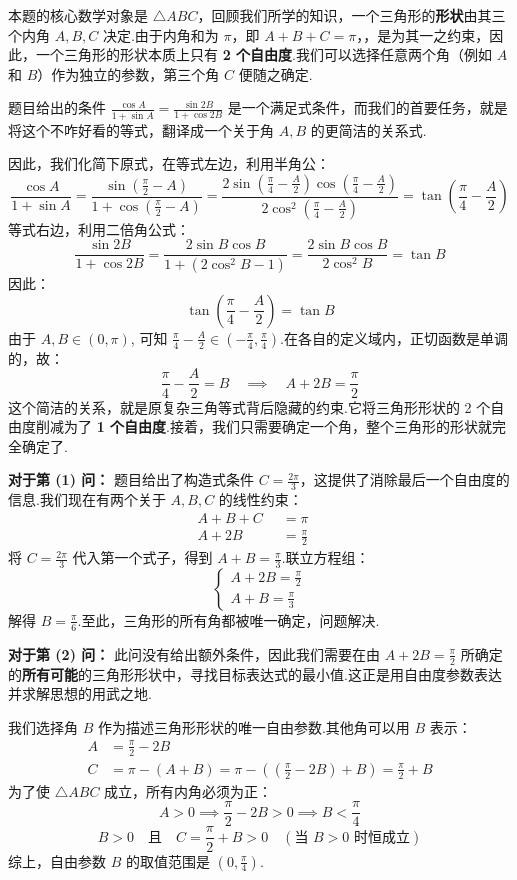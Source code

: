 \begin{solution}
	本题的核心数学对象是 $\triangle ABC$，回顾我们所学的知识，一个三角形的\textbf{形状}由其三个内角 $A, B, C$ 决定.由于内角和为 $\pi$，即 $A+B+C=\pi$，，是为其一之约束，因此，一个三角形的形状本质上只有 \textbf{2 个自由度}.我们可以选择任意两个角（例如 $A$ 和 $B$）作为独立的参数，第三个角 $C$ 便随之确定.
	
	题目给出的条件 $\frac{\cos A}{1+\sin A} = \frac{\sin 2B}{1+\cos 2B}$ 是一个满足式条件，而我们的首要任务，就是将这个不咋好看的等式，翻译成一个关于角 $A, B$ 的更简洁的关系式.
	
	因此，我们化简下原式，在等式左边，利用半角公：
	\[
	\frac{\cos A}{1+\sin A} = \frac{\sin(\frac{\pi}{2}-A)}{1+\cos(\frac{\pi}{2}-A)} = \frac{2\sin(\frac{\pi}{4}-\frac{A}{2})\cos(\frac{\pi}{4}-\frac{A}{2})}{2\cos^2(\frac{\pi}{4}-\frac{A}{2})} = \tan\left(\frac{\pi}{4}-\frac{A}{2}\right)
	\]
	等式右边，利用二倍角公式：
	\[
	\frac{\sin 2B}{1+\cos 2B} = \frac{2\sin B \cos B}{1+(2\cos^2 B-1)} = \frac{2\sin B \cos B}{2\cos^2 B} = \tan B
	\]
	因此：
	\[
	\tan\left(\frac{\pi}{4}-\frac{A}{2}\right) = \tan B
	\]
	由于 $A, B \in (0, \pi)$, 可知 $\frac{\pi}{4}-\frac{A}{2} \in (-\frac{\pi}{4}, \frac{\pi}{4})$.在各自的定义域内，正切函数是单调的，故：
	\[
	\frac{\pi}{4}-\frac{A}{2} = B \quad \implies \quad A+2B = \frac{\pi}{2}
	\]
	这个简洁的关系，就是原复杂三角等式背后隐藏的约束.它将三角形形状的 2 个自由度削减为了 \textbf{1 个自由度}.接着，我们只需要确定一个角，整个三角形的形状就完全确定了.
	
	\textbf{对于第 (1) 问：}
	题目给出了构造式条件 $C = \frac{2\pi}{3}$，这提供了消除最后一个自由度的信息.我们现在有两个关于 $A, B, C$ 的线性约束：
	\begin{align*}
		A+B+C &= \pi \quad  \\
		A+2B \qquad &= \frac{\pi}{2} \quad 
	\end{align*}
	将 $C=\frac{2\pi}{3}$ 代入第一个式子，得到 $A+B = \frac{\pi}{3}$.联立方程组：
	\[
	\begin{cases}
		A+2B = \frac{\pi}{2} \\
		A+B = \frac{\pi}{3}
	\end{cases}
	\]
	解得 $B = \frac{\pi}{6}$.至此，三角形的所有角都被唯一确定，问题解决.
	
	\textbf{对于第 (2) 问：}
	此问没有给出额外条件，因此我们需要在由 $A+2B=\frac{\pi}{2}$ 所确定的\textbf{所有可能}的三角形形状中，寻找目标表达式的最小值.这正是用自由度参数表达并求解思想的用武之地.
	
	我们选择角 $B$ 作为描述三角形形状的唯一自由参数.其他角可以用 $B$ 表示：
	\begin{align*}
		A &= \frac{\pi}{2}-2B \\
		C &= \pi - (A+B) = \pi - \left(\left(\frac{\pi}{2}-2B\right)+B\right) = \frac{\pi}{2}+B
	\end{align*}
	为了使 $\triangle ABC$ 成立，所有内角必须为正：
	\[
	A > 0 \implies \frac{\pi}{2}-2B > 0 \implies B < \frac{\pi}{4}
	\]
	\[
	B > 0 \quad \text{且} \quad C = \frac{\pi}{2}+B > 0 \quad (\text{当 } B>0 \text{ 时恒成立})
	\]
	综上，自由参数 $B$ 的取值范围是 $(0, \frac{\pi}{4})$.
	

\end{solution}
